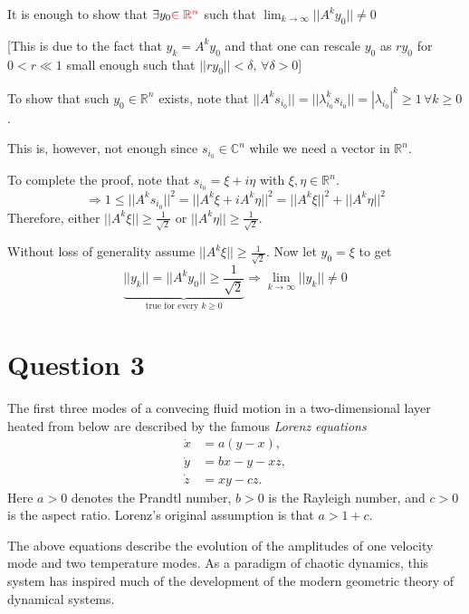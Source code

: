 \documentclass[twoside,10pt,a4paper]{article}
\begin{document}
\begin{enumerate}[label=(\alph*)]
It is enough to show that $\exists y_0 {\color{red}\in\mathbb{R}^n}$ such that $\lim_{k \rightarrow \infty} ||A^ky_0|| \neq 0$

[This is due to the fact that $y_k = A^ky_0$ and that one can rescale $y_0$ as $ry_0$ for $0<r \ll 1$ small enough such that $||ry_0||<\delta, \,\forall \delta > 0$]

To show that such $y_0 \in \mathbb{R}^n$ exists, note that $||A^ks_{i_0}|| = ||\lambda_{i_0}^ks_{i_0}|| = |\lambda_{i_0}|^k \geq 1 \,\forall k \geq 0$.
\begin{center}
	\color{red} This is, however, not enough since $s_{i_0}\in\mathbb{C}^n$ while we need a vector in $\mathbb{R}^n$.
\end{center}
To complete the proof, note that $s_{i_0}=\xi + i\eta$ with $\xi, \eta \in \mathbb{R}^n$.
\begin{equation*}
	\Longrightarrow 1 \leq ||A^ks_{i_0}||^2 = ||A^k\xi + i A^k\eta ||^2 = ||A^k\xi||^2 + ||A^k\eta||^2
\end{equation*}
Therefore, either $||A^k\xi|| \geq \frac{1}{\sqrt{2}}$ or $||A^k\eta|| \geq \frac{1}{\sqrt{2}}$.

Without loss of generality assume $||A^k\xi|| \geq \frac{1}{\sqrt{2}}$. Now let $y_0 = \xi$ to get
\begin{equation*}
	\underbrace{||y_k|| = ||A^ky_0|| \geq \frac{1}{\sqrt{2}}}_{\text{true for every }k\geq 0} \Longrightarrow \lim_{k \rightarrow \infty} ||y_k|| \neq 0
\end{equation*}

\end{enumerate}

\newpage

\section*{Question 3}
The first three modes of a convecing fluid motion in a two-dimensional layer heated from below are described by the famous \textit{Lorenz equations}
\begin{align*}
	\dot{x} &= a(y - x), \\
	\dot{y} &= bx - y - xz, \\
	\dot{z} &= xy - cz.
\end{align*}
Here $a>0$ denotes the Prandtl number, $b>0$ is the Rayleigh number, and $c>0$ is the aspect ratio. Lorenz's original assumption is that $a > 1 + c$.

The above equations describe the evolution of the amplitudes of one velocity mode and two temperature modes. As a paradigm of chaotic dynamics, this system has inspired much of the development of the modern geometric theory of dynamical systems.
\end{document}
